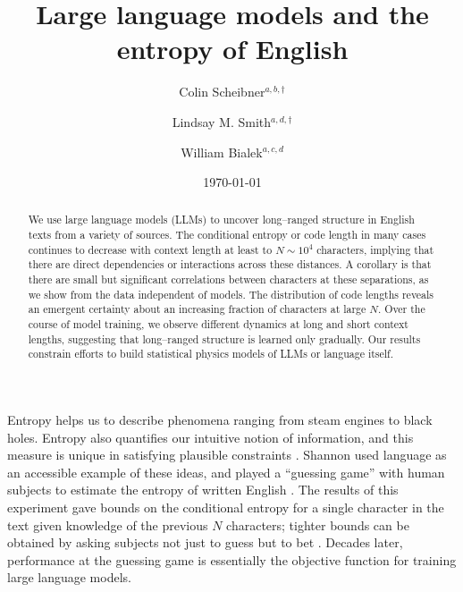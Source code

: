 \documentclass[aps,twocolumn,floats,prx]{revtex4}
\begin{document}
\title{Large language models and the entropy of English}

\author{Colin Scheibner$^{a,b,\dagger}$}
\author{Lindsay M. Smith$^{a,d,\dagger}$}
\author{William Bialek$^{a,c,d}$} 

\begin{abstract}
We use large language models (LLMs) to uncover long--ranged structure in English texts from a variety of sources. The conditional entropy or code length in many cases continues to decrease with context length at least to $N\sim 10^4$ characters, implying that there are direct dependencies or interactions across these distances. A corollary is that there are small but significant correlations between characters at these separations, as we show from the data independent of models.  The distribution of code lengths reveals an emergent certainty about an increasing fraction of characters at large $N$. Over the course of model training, we observe  different dynamics at long and short context lengths, suggesting that long--ranged structure is  learned only gradually.  Our results constrain efforts to build statistical physics models of LLMs or language itself.
\end{abstract}



%
\date{\today}
%
\maketitle


\begingroup
\renewcommand\thefootnote{$\dagger$}
\endgroup

Entropy helps us to describe phenomena ranging from steam engines to black holes.  Entropy also quantifies our intuitive notion of information, and this measure is unique in satisfying plausible constraints \cite{Shannon_1948}.  Shannon used language as an accessible example of these ideas, and played a ``guessing game'' with human subjects to estimate the entropy of written English \cite{Shannon_1951}.  The results of this experiment gave bounds on the conditional entropy for a single character in the text given knowledge of the previous $N$ characters; tighter bounds can be obtained by asking subjects not just to guess but to bet \cite{Cover+King_1978}.  Decades later, performance at the guessing game is essentially the objective function for training large language models.
\end{document}
